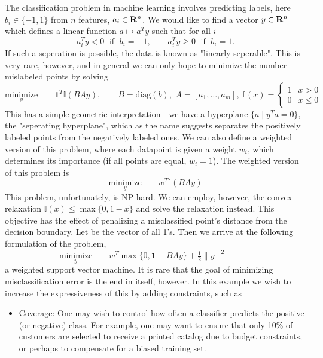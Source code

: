 \begin{example} \label{ex:dataset-constraints}
The classification problem in machine learning involves predicting labels,
here $b_i \in \{-1,1\}$ from $n$ features, $a_i \in \mathbf{R}^n$. We would
like to find a vector $y \in \mathbf{R}^n$ which defines a linear function $a \mapsto a^Ty$ such that for all $i$
$$a_i^Ty < 0 \; \mbox{ if }\;  b_i = -1, \qquad 
a_i^Ty \geq 0 \; \mbox{ if }\; b_i = 1.$$ 
If such a seperation is possible, the data is known as "linearly seperable". This is very
rare, however, and in general we can only hope to minimize the number mislabeled points by solving
$$
\underset{y}{\mbox{minimize}}\qquad \mathbf{1}^{T}\mathbb{I}(BAy), \qquad B = \mbox{diag}(b), \,\, A = [a_1,\dots,a_m], \,\, \mathbb{I}(x)=\begin{cases}
1 & x>0\\
0 & x\leq0
\end{cases}
$$ 
This has a simple geometric interpretation - we have a hyperplane $\{ a \mid
y^Ta = 0 \}$, the "seperating hyperplane", which as the name suggests
separates the positively labeled points from the negatively labeled ones.  We
can also define a weighted version of this problem, where each datapoint is
given a weight $w_i$, which determines its importance (if all points are
equal, $w_i = 1$). The weighted version of this problem is
$$
\underset{y}{\mbox{minimize}}\qquad w^{T}\mathbb{I}(BAy)
$$ 
This problem, unfortunately, is NP-hard. We can employ, however, the convex relaxation
$\mathbb{I}(x)\leq \max\{0, 1- x\}$ and solve the relaxation instead. This objective has
the effect of penalizing a misclassified point's distance from the decision
boundary. Let  be the vector of all 1's. Then we arrive at the following formulation of the problem,
$$
\underset{y}{\mbox{minimize}}\qquad w^{T}\max\{0,\mathbf{1}-BAy\}+\tfrac{1}{2}\|y\|^{2}
\qquad \quad
$$ 
a weighted support vector machine. It is
rare that the goal of minimizing misclassification error is the end in
itself, however. In this example we wish to increase the expressiveness of
this by adding constraints, such as
\begin{itemize}

\item  {Coverage}: One may wish to control how often a classifier predicts the
positive (or negative) class. For example, one may want to ensure that only
10\% of customers are selected to receive a printed catalog due to budget
constraints, or perhaps to compensate for a biased training set.


\end{itemize}
\end{example}
